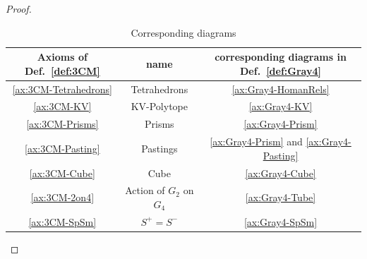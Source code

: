\documentclass[11pt, reqno]{amsart} %
\theoremstyle{definition}
\theoremstyle{remark}
\numberwithin{equation}{section}
\begin{document}
\begin{proof}
\begin{enumerate}
  \begin{center}
    \begin{table}[htb]
      \caption{Corresponding diagrams}
      \label{tab:diagram-rel}
      \begin{tabular}{ccc}
        \hline
        Axioms of Def.~\ref{def:3CM} & name & corresponding diagrams in Def.~\ref{def:Gray4} \\ \hline
        \ref{ax:3CM-Tetrahedrons} & Tetrahedrons & \ref{ax:Gray4-HomanRels} \\
        \ref{ax:3CM-KV} & KV-Polytope & \ref{ax:Gray4-KV} \\
        \ref{ax:3CM-Prisms} & Prisms & \ref{ax:Gray4-Prism} \\
        \ref{ax:3CM-Pasting} & Pastings & \ref{ax:Gray4-Prism} and \ref{ax:Gray4-Pasting} \\
        \ref{ax:3CM-Cube} & Cube & \ref{ax:Gray4-Cube} \\
        \ref{ax:3CM-2on4} & Action of $G_2$ on $G_4$ & \ref{ax:Gray4-Tube} \\
        \ref{ax:3CM-SpSm} & $S^+=S^-$ & \ref{ax:Gray4-SpSm}\\\hline
      \end{tabular}
    \end{table}
  \end{center}
  

\end{enumerate}
\end{proof}
\end{document}
